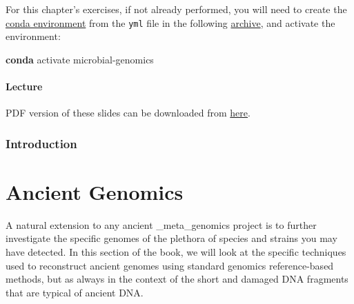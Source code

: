 \documentclass[
  letterpaper,
]{book}
\newenvironment{Shaded}{}{}
\newcommand{\ExtensionTok}[1]{\textcolor[rgb]{0.84,0.23,0.29}{\textbf{#1}}}
\newcommand{\NormalTok}[1]{\textcolor[rgb]{0.14,0.16,0.18}{#1}}
\begin{document}
\begin{tcolorbox}[enhanced jigsaw, opacitybacktitle=0.6, bottomtitle=1mm, opacityback=0, colback=white, coltitle=black, leftrule=.75mm, toprule=.15mm, title=\textcolor{quarto-callout-tip-color}{\faLightbulb}\hspace{0.5em}{Tip}, colframe=quarto-callout-tip-color-frame, toptitle=1mm, arc=.35mm, left=2mm, titlerule=0mm, breakable, rightrule=.15mm, bottomrule=.15mm, colbacktitle=quarto-callout-tip-color!10!white]

For this chapter's exercises, if not already performed, you will need to
create the \protect\hyperlink{creating-a-conda-environment}{conda
environment} from the \texttt{yml} file in the following
\href{https://doi.org/10.5281/zenodo.6983178}{archive}, and activate the
environment:

\begin{Shaded}
\begin{Highlighting}[]
\ExtensionTok{conda}\NormalTok{ activate microbial{-}genomics}
\end{Highlighting}
\end{Shaded}

\end{tcolorbox}

\hypertarget{lecture-11}{%
\subsection{Lecture}\label{lecture-11}}

PDF version of these slides can be downloaded from
\href{https://github.com/SPAAM-community/wss-summer-school/raw/main/docs/assets/slides/2022/4c-intro-to-denovoassembly/SPAAM\%20Summer\%20School\%202022\%20-\%204C\%20-\%20Genome\%20Assembly.pdf}{here}.

\hypertarget{introduction-3}{%
\section{Introduction}\label{introduction-3}}

\part{Ancient Genomics}

A natural extension to any ancient \_meta\_genomics project is to
further investigate the specific genomes of the plethora of species and
strains you may have detected. In this section of the book, we will look
at the specific techniques used to reconstruct ancient genomes using
standard genomics reference-based methods, but as always in the context
of the short and damaged DNA fragments that are typical of ancient DNA.
\end{document}

